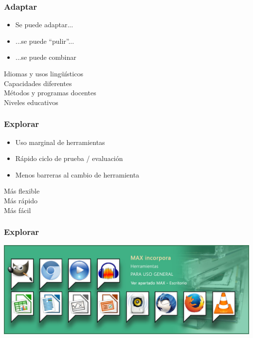 \documentclass[17pt,aspectratio=169]{beamer}
\begin{document}

\begin{frame}
\frametitle{Adaptar}

\begin{itemize}
\item Se puede adaptar...
\item ...se puede ``pulir''...
\item ...se puede combinar
\end{itemize}

\begin{flushright}
  Idiomas y usos lingüísticos \\
  Capacidades diferentes \\
  Métodos y programas docentes \\
  Niveles educativos \\
\end{flushright}
\end{frame}


\begin{frame}
\frametitle{Explorar}

\begin{itemize}
\item Uso marginal de herramientas
\item Rápido ciclo de prueba / evaluación
\item Menos barreras al cambio de herramienta
\end{itemize}

\begin{flushright}
  Más flexible \\
  Más rápido \\
  Más fácil
\end{flushright}
\end{frame}


\begin{frame}
\frametitle{Explorar}

\includegraphics[width=\linewidth]{figs/max-1}

\end{frame}
\end{document}
